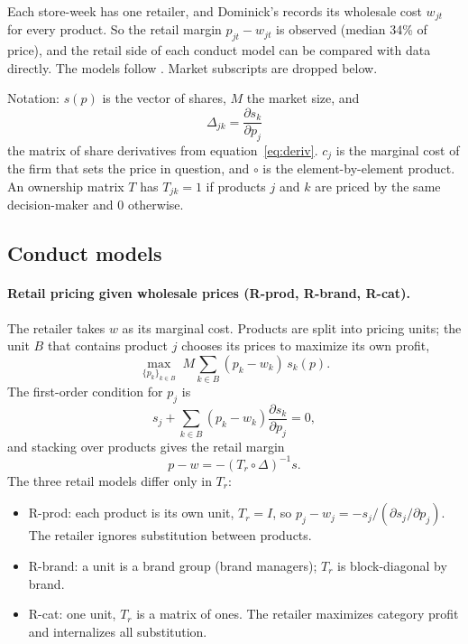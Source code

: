 \documentclass[11pt]{article}
\newcommand{\model}[1]{\textsf{#1}}
\begin{document}
Each store-week has one retailer, and Dominick's records its wholesale cost $w_{jt}$ for
every product. So the retail margin $p_{jt} - w_{jt}$ is observed (median 34\% of price), and
the retail side of each conduct model can be compared with data directly. The models follow
\citet{villasboas2007}. Market subscripts are dropped below.

Notation: $s(p)$ is the vector of shares, $M$ the market size, and
\[
  \Delta_{jk} = \frac{\partial s_k}{\partial p_j}
\]
the matrix of share derivatives from equation~\eqref{eq:deriv}. $c_j$ is the marginal cost of
the firm that sets the price in question, and $\circ$ is the element-by-element product. An
ownership matrix $T$ has $T_{jk} = 1$ if products $j$ and $k$ are priced by the same
decision-maker and 0 otherwise.

\subsection{Conduct models}\label{sec:models}

\paragraph{Retail pricing given wholesale prices (\model{R-prod}, \model{R-brand},
\model{R-cat}).} The retailer takes $w$ as its marginal cost. Products are split into pricing
units; the unit $B$ that contains product $j$ chooses its prices to maximize its own profit,
\begin{equation}
  \max_{\{p_k\}_{k \in B}} \; M \sum_{k \in B} (p_k - w_k)\, s_k(p) .
\end{equation}
The first-order condition for $p_j$ is
\begin{equation}
  s_j + \sum_{k \in B} (p_k - w_k) \frac{\partial s_k}{\partial p_j} = 0 ,
\end{equation}
and stacking over products gives the retail margin
\begin{equation}
  p - w = -\left( T_r \circ \Delta \right)^{-1} s .
  \label{eq:retail}
\end{equation}
The three retail models differ only in $T_r$:
\begin{itemize}
  \item \model{R-prod}: each product is its own unit, $T_r = I$, so
        $p_j - w_j = -s_j / (\partial s_j / \partial p_j)$. The retailer ignores substitution
        between products.
  \item \model{R-brand}: a unit is a brand group (brand managers); $T_r$ is block-diagonal
        by brand.
  \item \model{R-cat}: one unit, $T_r$ is a matrix of ones. The retailer maximizes category
        profit and internalizes all substitution.
\end{itemize}
\end{document}
